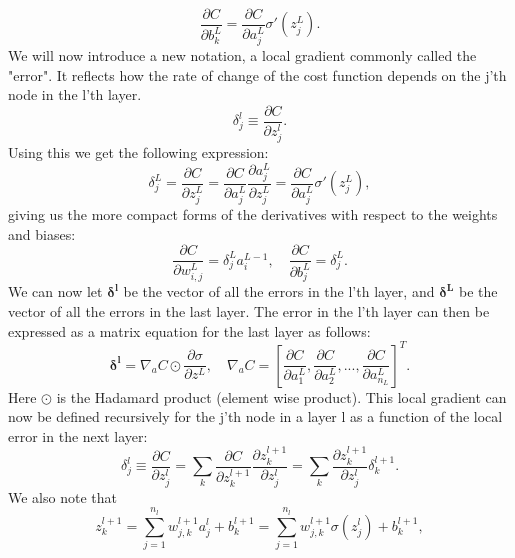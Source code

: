 \begin{equation*}
    \frac{\partial C}{\partial b_k^L} = \frac{\partial C}{\partial a_j^L}\sigma'(z_j^L). 
\end{equation*}
We will now introduce a new notation, a local gradient commonly called the "error". It reflects how the rate of change of the cost function depends on the j'th node in the l'th layer.
\begin{equation*}
    \delta_j^l \equiv \frac{\partial C}{\partial z_j^l}.  
\end{equation*}
Using this we get the following expression:
\begin{equation*}
    \delta_j^L=  \frac{\partial C}{\partial z_j^L} = \frac{\partial C}{\partial a_j^L}\frac{\partial a_j^L}{\partial z_j^L} = \frac{\partial C}{\partial a_j^L}\sigma'(z_j^L),
\end{equation*}
giving us the more compact forms of the derivatives with respect to the weights and biases:
\begin{equation*}
    \frac{\partial C}{\partial w_{i,j}^L} = \delta_j^La_i^{L-1}, \quad \frac{\partial C}{\partial b_j^L} = \delta_j^L.
\end{equation*}
We can now let $\boldsymbol{\delta^l}$ be the vector of all the errors in the l'th layer, and $\boldsymbol{\delta^L}$ be the vector of all the errors in the last layer. 
The error in the l'th layer can then be expressed as a matrix equation for the last layer as follows:
\begin{equation*}
    \boldsymbol{\delta^l} = \nabla_aC \odot \frac{\partial \sigma}{\partial z^L}, \quad \nabla_aC = \left[\frac{\partial C}{\partial a_1^L}, \frac{\partial C}{\partial a_2^L}, ..., \frac{\partial C}{\partial a_{n_L}^L} \right]^T.
\end{equation*}
Here $\odot$ is the Hadamard product (element wise product). This local gradient can now be defined recursively for the j'th node in a layer l as a function of the local error in the next layer:
\begin{equation}
    \label{eq:localgradient}
    \delta_j^l \equiv \frac{\partial C}{\partial z_j^l} = \sum_k \frac{\partial C}{\partial z_k^{l+1}}\frac{\partial z_k^{l+1}}{\partial z_j^l} = \sum_k \frac{\partial z_k^{l+1}}{\partial z_j^l} \delta_k^{l+1}.
\end{equation}
We also note that 
\begin{equation*}
    z_k^{l+1} = \sum_{j=1}^{n_l} w_{j,k}^{l+1}a_j^l + b_k^{l+1} = \sum_{j=1}^{n_l} w_{j,k}^{l+1}\sigma(z_j^l) + b_k^{l+1},
\end{equation*} 
